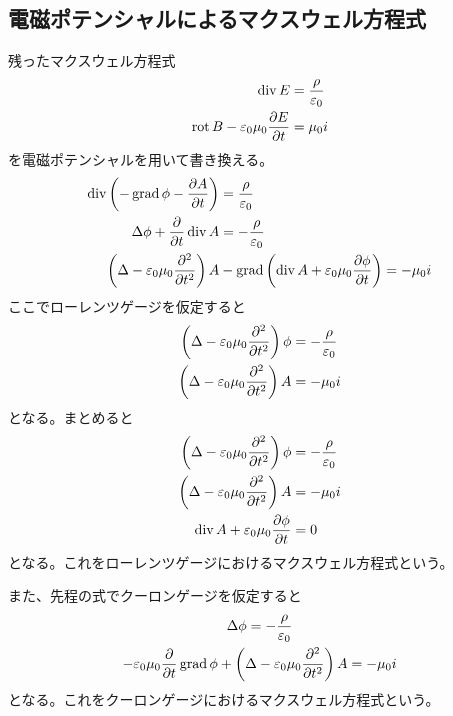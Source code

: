 \subsection{電磁ポテンシャルによるマクスウェル方程式}
    残ったマクスウェル方程式
    \begin{align*}
        \operatorname{div} E &= \frac{\rho}{\varepsilon_0}\\
        \operatorname{rot} B - \varepsilon_0\mu_0\pdv{E}{t} &= \mu_0 i
    \end{align*}
    を電磁ポテンシャルを用いて書き換える。
    \begin{align*}
        \operatorname{div} \left(-\operatorname{grad}\phi - \pdv{A}{t}\right) &= \frac{\rho}{\varepsilon_0}\\
        \Delta \phi + \pdv{t}\operatorname{div} A &= -\frac{\rho}{\varepsilon_0}\\
        \left(\Delta - \varepsilon_0\mu_0\pdv[2]{t}\right)A &- \operatorname{grad}\left(\operatorname{div} A + \varepsilon_0\mu_0\pdv{\phi}{t}\right) = -\mu_0 i
    \end{align*}
    ここでローレンツゲージを仮定すると
    \begin{align*}
        \left(\Delta-\varepsilon_0\mu_0\pdv[2]{t}\right)\phi &= -\frac{\rho}{\varepsilon_0}\\
        \left(\Delta-\varepsilon_0\mu_0\pdv[2]{t}\right)A &= -\mu_0 i
    \end{align*}
    となる。まとめると
    \begin{align*}
        \left(\Delta-\varepsilon_0\mu_0\pdv[2]{t}\right)\phi &= -\frac{\rho}{\varepsilon_0}\\
        \left(\Delta-\varepsilon_0\mu_0\pdv[2]{t}\right)A &= -\mu_0 i\\
        \operatorname{div} A + \varepsilon_0\mu_0\pdv{\phi}{t} &= 0
    \end{align*}
    となる。これをローレンツゲージにおけるマクスウェル方程式という。

    また、先程の式でクーロンゲージを仮定すると
    \begin{gather*}
        \Delta \phi = -\frac{\rho}{\varepsilon_0}\\
        -\varepsilon_0\mu_0\pdv{t}\operatorname{grad}\phi + \left(\Delta - \varepsilon_0\mu_0\pdv[2]{t}\right)A = -\mu_0 i
    \end{gather*}
    となる。これをクーロンゲージにおけるマクスウェル方程式という。

